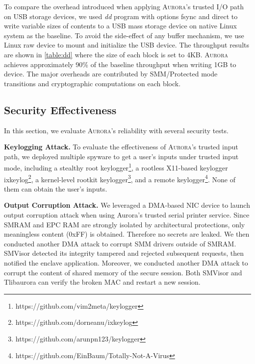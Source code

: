 To compare the overhead introduced when applying \textsc{Aurora}'s trusted I/O path on USB storage devices, we used \emph{dd} program with options \textsf{fsync} and \textsf{direct} to write variable sizes of contents to a USB mass storage device on native Linux system as the baseline. To avoid the side-effect of any buffer mechanism, we use Linux raw device to mount and initialize the USB device. %
The throughput results are shown in \autoref{table:dd} where the size of each block is set to 4KB. \textsc{Aurora} achieves approximately 90\% of the baseline throughput when writing 1GB to device. The major overheads are contributed by SMM/Protected mode transitions and cryptographic computations on each block.

\subsection{Security Effectiveness}\label{security}
In this section, we evaluate \textsc{Aurora}'s reliability with several security tests.

\textbf{Keylogging Attack.}
To evaluate the effectiveness of \textsc{Aurora}'s trusted input path, we deployed multiple spyware to get a user's inputs under trusted input mode, including a stealthy root keylogger\footnote{https://github.com/vim2meta/keylogger}, a rootless X11-based keylogger ixkeylog\footnote{https://github.com/dorneanu/ixkeylog}, 
a kernel-level rootkit  keylogger\footnote{https://github.com/arunpn123/keylogger}, 
and a remote keylogger\footnote{https://github.com/EinBaum/Totally-Not-A-Virus}. None of them can obtain the user's inputs.

\textbf{Output Corruption Attack.}
We leveraged a DMA-based NIC device to launch output corruption attack when using Aurora's trusted serial printer service. Since  SMRAM and EPC RAM are strongly isolated by architectural protections, only meaningless content (0xFF) is obtained. Therefore no secrets are leaked. We then conducted another DMA attack to corrupt SMM drivers outside of SMRAM. SMVisor detected its integrity tampered  and rejected subsequent requests, then notified the enclave application. Moreover, we conducted another DMA attack to corrupt the content of shared memory of the secure session. Both SMVisor and Tlibaurora can verify the broken MAC and restart a new session.

